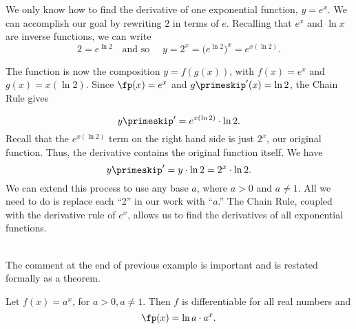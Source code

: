 {We only know how to find the derivative of one exponential function, $y = e^x$. %
 We can accomplish our goal by rewriting $2$ in terms of $e$. Recalling that $e^x$ and $\ln x$ are inverse functions, we can write
\[
2=e^{\ln 2} \quad \text{and so }\quad y=2^x = \big(e^{\ln 2}\big)^x = e^{x(\ln 2)}.
\]


%

The function is now the composition $y=f(g(x))$, with $f(x) = e^x$ and $g(x) = x(\ln 2)$.  Since $\fp(x) = e^x$ and $g\primeskip'(x) = \ln 2$, the Chain Rule  gives 

\[
y\primeskip' = e^{x (\ln 2)} \cdot \ln 2.
\]
Recall that the $e^{x(\ln 2)}$ term on the right hand side is just $2^x$, our original function. Thus, the derivative contains the original function itself. We have
\[
y\primeskip' = y \cdot \ln 2 = 2^x\cdot \ln 2.
\]
We can extend this process to use any base $a$, where $a>0$ and $a\neq 1$. All we need to do is replace each ``2'' in our work with ``$a$.'' The Chain Rule, coupled with the derivative rule of $e^x$, allows us to find the derivatives of all exponential functions.
}\\

The comment at the end of previous example is important and is restated formally as a theorem.

{Let $f(x)=a^x$, for $a>0, a\neq 1$. Then $f$ is differentiable for all real numbers and 
\[
\fp(x) = \ln a\cdot a^x.
\]
}

